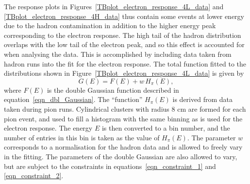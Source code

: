 %
%
%


 

The response plots in Figures~\ref{TBplot_electron_response_4L_data} and \ref{TBplot_electron_response_4H_data} thus contain some events at lower energy due to the hadron contamination in addition to the higher energy peak corresponding to the electron response. The high tail of the hadron distribution overlaps with the low tail of the electron peak, and so this effect is accounted for when analysing the data. This is accomplished by including data taken from hadron runs into the fit for the electron response. The total function fitted to the distributions shown in Figure~\ref{TBplot_electron_response_4L_data} is given by
\begin{equation}
G(E) = F(E) + w \, H_\pi(E),
\end{equation}
where $F(E)$ is the double Gaussian function described in equation~\ref{eqn_dbl_Gaussian}. The ``function'' $H_\pi(E)$ is derived from data taken during pion runs. Cylindrical clusters with radius 8 cm are formed for each pion event, and used to fill a histogram with the same binning as is used for the electron response. The energy $E$ is then converted to a bin number, and the number of entries in this bin is taken as the value of $H_\pi(E)$. The parameter $w$ corresponds to a normalisation for the hadron data and is allowed to freely vary in the fitting. The parameters of the double Gaussian are also allowed to vary, but are subject to the constraints in equations~\ref{eqn_constraint_1} and \ref{eqn_constraint_2}.


